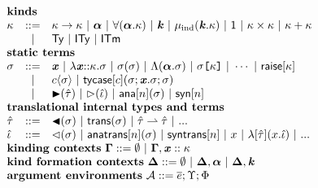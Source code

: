 $\begin{array}{lcl}%
\multicolumn{3}{>{$}l<{$}}{\textbf{kinds}}\\
\kappa & ::= & %
\karrow{\kappa}{\kappa} ~|~%
\kalpha ~|~%
\kforall{\kalpha}{\kappa} ~|~%
\kvar ~|~%
\kmu{\kvar}{\kappa} ~|~%
\kunit ~|~%
\kprod{\kappa}{\kappa} ~|~%
\ksum{\kappa}{\kappa}\\
&~|~&\kty ~|~%
\kity ~|~%
\kitm \\
\multicolumn{3}{l}{\textbf{static terms}}\\
\st & ::= & %
\sx ~|~%
\slam{\kappa}{\sx}{\st} ~|~%
\sap{\st}{\st} ~|~%
\sLam{\kalpha}{\st} ~|~%
\skap{\kappa}{\st} ~|~ \cdots ~|~%
\sraise{\kappa}\\
&~|~&\sty{c}{\st} ~|~%
\stycase{c}{\st}{\sx}{\st}{\st}\\
&~|~&\sqity{\qity}  ~|~%
\sqitm{\qitm} ~|~%
{\technical{\sana{n}{\st}}} ~|~%
{\technical{\ssyn{n}}}\\
\multicolumn{3}{l}{\textbf{translational internal types and terms}}\\
\qity & ::= & \quqty{\st} ~|~ \srep{\st} ~|~ \iparr{\qity}{\qity} ~|~ ...\\
\qitm & ::= & \quqtm{\st} ~|~ \anatrans{n}{\st} ~|~ \syntrans{n} ~|~ x ~|~ \ilam{\qity}{x}{\qitm} ~|~ ... \\
\multicolumn{3}{l}{\textbf{kinding contexts}~\kGamma ::= \emptyset ~|~ \kGamma, \sx :: \kappa}\\
\multicolumn{3}{l}{\textbf{kind formation contexts}~\kDelta ::= \emptyset ~|~ \kDelta, \kalpha ~|~ \kDelta, \kvar}\\
\multicolumn{3}{l}{\textbf{argument environments}~\argEnv ::= \es; \Upsilon; \Phi}\\
\end{array}%
$